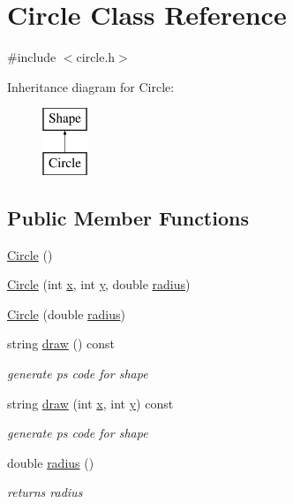\hypertarget{class_circle}{}\section{Circle Class Reference}
\label{class_circle}


{\ttfamily \#include $<$circle.\+h$>$}

Inheritance diagram for Circle\+:\begin{figure}[H]
\begin{center}
\leavevmode
\includegraphics[height=2.000000cm]{class_circle}
\end{center}
\end{figure}
\subsection*{Public Member Functions}
\begin{DoxyCompactItemize}
\item 
\hyperlink{class_circle_ad1ecfcfc7bf34529c6a6d6c448bf70fe}{Circle} ()
\item 
\hyperlink{class_circle_ace551ce2e85abb8660f74ee34f5761a1}{Circle} (int \hyperlink{class_shape_a41e403e73d2949f1a6adfba6032c41ec}{x}, int \hyperlink{class_shape_ac757f715cc5b5681f2c691663ac06f0a}{y}, double \hyperlink{class_circle_addf06b37dda7589ade30e7ea21fe17be}{radius})
\item 
\hyperlink{class_circle_a05c707753451188c26b43508b610ff8e}{Circle} (double \hyperlink{class_circle_addf06b37dda7589ade30e7ea21fe17be}{radius})
\item 
string \hyperlink{class_circle_a3fcc66abd3f30a3c19e3bb63452fc2ed}{draw} () const 
\begin{DoxyCompactList}\small\item\em generate ps code for shape \end{DoxyCompactList}\item 
string \hyperlink{class_circle_a18f2b8aaa80fb870c3aea1798f32678b}{draw} (int \hyperlink{class_shape_a41e403e73d2949f1a6adfba6032c41ec}{x}, int \hyperlink{class_shape_ac757f715cc5b5681f2c691663ac06f0a}{y}) const 
\begin{DoxyCompactList}\small\item\em generate ps code for shape \end{DoxyCompactList}\item 
double \hyperlink{class_circle_addf06b37dda7589ade30e7ea21fe17be}{radius} ()
\begin{DoxyCompactList}\small\item\em returns radius \end{DoxyCompactList}\end{DoxyCompactItemize}
